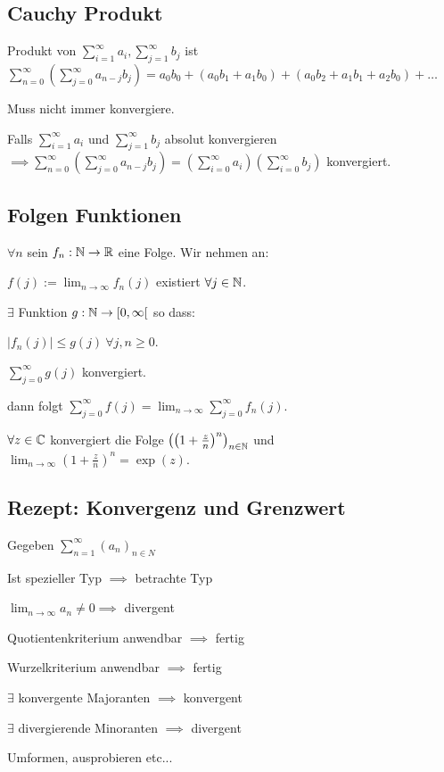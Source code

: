 \subsection{Cauchy Produkt}
Produkt von $\sum_{i=1}^{\infty} a_i, \sum_{j=1}^{\infty} b_j$ ist $\sum_{n=0}^{\infty} \left( \sum_{j=0}^{\infty} a_{n-j}b_j \right) = a_0b_0 + (a_0b_1 + a_1b_0) + (a_0b_2 + a_1b_1 + a_2b_0) + \dots$
\begin{compactitem}
    \item Muss nicht immer konvergiere.
    \item Falls $\sum_{i=1}^{\infty} a_i$ und $\sum_{j=1}^{\infty} b_j$ absolut konvergieren $\implies \sum_{n=0}^{\infty} \left( \sum_{j=0}^{\infty} a_{n-j}b_j \right) = \left( \sum_{i=0}^{\infty} a_i \right) \left( \sum_{i=0}^{\infty} b_j \right) $ konvergiert.
\end{compactitem}

\subsection{Folgen Funktionen}
$\forall n$ sein $f_n : \mathbb{N} \to \mathbb{R}$ eine Folge. Wir nehmen an:
\begin{compactenum}
    \item $f(j) := \lim_{n \to \infty} f_n(j)$ existiert $\forall j \in \mathbb{N}$.
    \item $\exists$ Funktion $g: \mathbb{N} \to [0, \infty[$ so dass:
        \begin{compactenum}[{2}.1]
            \item $\left| f_n(j) \right| \le g(j) \ \forall j,n \ge 0$.
            \item $\sum_{j=0}^{\infty} g(j)$ konvergiert.
        \end{compactenum}
\end{compactenum}
dann folgt $\sum_{j=0}^{\infty} f(j) = \lim_{n \to \infty} \sum_{j=0}^{\infty} f_n(j)$.
\begin{compactitem}
\item $\forall z \in \mathbb{C}$ konvergiert die Folge $\left( \left( 1 + \frac{z}{n} \right)^n  \right)_{n \in \mathbb{N}} $ und $\lim_{n \to \infty} \left( 1 + \frac{z}{n} \right)^n = \exp(z)$.
\end{compactitem}

\subsection{Rezept: Konvergenz und Grenzwert}
Gegeben $\sum_{n=1}^{\infty} (a_n)_{n \in N}$
\begin{compactenum}
    \item Ist spezieller Typ $\implies$ betrachte Typ
    \item $\lim_{n \to \infty} a_n \neq 0 \implies$ divergent
    \item Quotientenkriterium anwendbar $\implies$ fertig
    \item Wurzelkriterium anwendbar $\implies$ fertig
    \item $\exists$ konvergente Majoranten $\implies$ konvergent
    \item $\exists$ divergierende Minoranten $\implies$ divergent
    \item Umformen, ausprobieren etc...
\end{compactenum}
